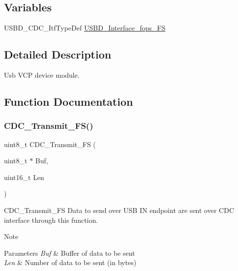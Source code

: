 \subsection*{Variables}
\begin{DoxyCompactItemize}
\item 
U\+S\+B\+D\+\_\+\+C\+D\+C\+\_\+\+Itf\+Type\+Def \hyperlink{group__USBD__CDC__IF_ga99394ed19b774f171df96c2848c411ed}{U\+S\+B\+D\+\_\+\+Interface\+\_\+fops\+\_\+\+FS}
\end{DoxyCompactItemize}


\subsection{Detailed Description}
Usb V\+CP device module. 



\subsection{Function Documentation}
\mbox{\label{group__USBD__CDC__IF_ga5137d6201dbdef2bf351c5b4941c24f4}} 
\subsubsection{\texorpdfstring{C\+D\+C\+\_\+\+Transmit\+\_\+\+F\+S()}{CDC\_Transmit\_FS()}}
{\footnotesize\ttfamily uint8\+\_\+t C\+D\+C\+\_\+\+Transmit\+\_\+\+FS (\begin{DoxyParamCaption}\item[{uint8\+\_\+t $\ast$}]{Buf,  }\item[{uint16\+\_\+t}]{Len }\end{DoxyParamCaption})}



C\+D\+C\+\_\+\+Transmit\+\_\+\+FS Data to send over U\+SB IN endpoint are sent over C\+DC interface through this function. 

\begin{DoxyNote}{Note}

\end{DoxyNote}

\begin{DoxyParams}{Parameters}
{\em Buf} & Buffer of data to be sent \\
\hline
{\em Len} & Number of data to be sent (in bytes) \\
\hline
\end{DoxyParams}

